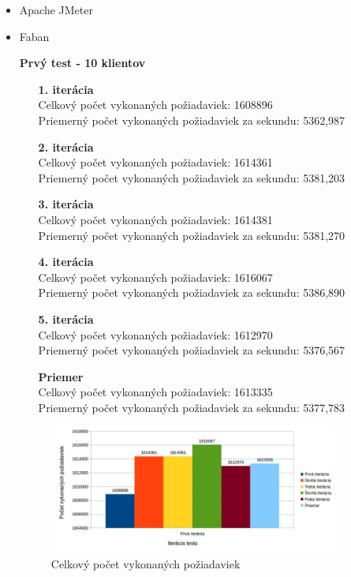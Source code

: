 \documentclass[12pt,oneside,final]{fithesis-utf8}
\begin{document}
\begin{itemize}

\item Apache JMeter

\item Faban

\textbf{Prvý test - 10 klientov}
\begin{itemize}

\item[\textbf{1. iterácia}]\ \\
Celkový počet vykonaných požiadaviek: 1608896\\
Priemerný počet vykonaných požiadaviek za sekundu: 5362,987

\item[\textbf{2. iterácia}]\ \\
Celkový počet vykonaných požiadaviek: 1614361\\
Priemerný počet vykonaných požiadaviek za sekundu: 5381,203

\item[\textbf{3. iterácia}]\ \\
Celkový počet vykonaných požiadaviek: 1614381\\
Priemerný počet vykonaných požiadaviek za sekundu: 5381,270

\item[\textbf{4. iterácia}]\ \\
Celkový počet vykonaných požiadaviek: 1616067\\
Priemerný počet vykonaných požiadaviek za sekundu: 5386,890

\item[\textbf{5. iterácia}]\ \\
Celkový počet vykonaných požiadaviek: 1612970\\
Priemerný počet vykonaných požiadaviek za sekundu: 5376,567

\item[\textbf{Priemer}]\ \\
Celkový počet vykonaných požiadaviek: 1613335\\
Priemerný počet vykonaných požiadaviek za sekundu: 5377,783

\end{itemize}

\begin{figure}[H]
  \centering
      \includegraphics[width=0.9\textwidth]{faban2_1.jpg}
  \caption{Celkový počet vykonaných požiadaviek}
\end{figure}


\end{itemize}
\end{document}
